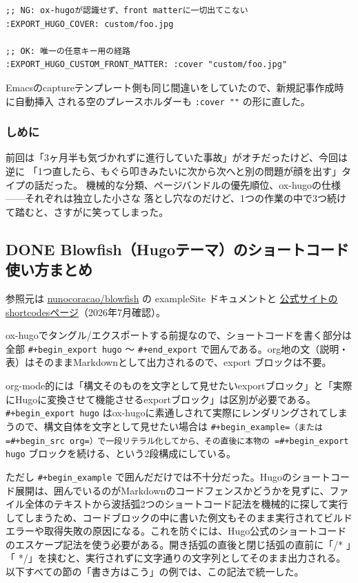 \documentclass[11pt]{article}
\begin{document}
\begin{verbatim}
;; NG: ox-hugoが認識せず、front matterに一切出てこない
:EXPORT_HUGO_COVER: custom/foo.jpg

;; OK: 唯一の任意キー用の経路
:EXPORT_HUGO_CUSTOM_FRONT_MATTER: :cover "custom/foo.jpg"
\end{verbatim}

Emacsのcaptureテンプレート側も同じ間違いをしていたので、新規記事作成時に自動挿入
される空のプレースホルダーも \texttt{:cover ""} の形に直した。
\subsubsection{しめに}
\label{sec:org6e4ee3c}

前回は「3ヶ月半も気づかれずに進行していた事故」がオチだったけど、今回は逆に
「1つ直したら、もぐら叩きみたいに次から次へと別の問題が顔を出す」タイプの話だった。
機械的な分類、ページバンドルの優先順位、ox-hugoの仕様——それぞれは独立した小さな
落とし穴なのだけど、1つの作業の中で3つ続けて踏むと、さすがに笑ってしまった。
\subsection{{\bfseries\sffamily DONE} Blowfish（Hugoテーマ）のショートコード使い方まとめ}
\label{sec:orgb8fda35}
参照元は \href{https://github.com/nunocoracao/blowfish}{nunocoracao/blowfish} の exampleSite ドキュメントと \href{https://blowfish.page/docs/shortcodes/}{公式サイトのshortcodesページ}（2026年7月確認）。

ox-hugoでタングル/エクスポートする前提なので、ショートコードを書く部分は全部 \texttt{\#+begin\_export hugo} 〜 \texttt{\#+end\_export} で囲んである。org地の文（説明・表）はそのままMarkdownとして出力されるので、export ブロックは不要。

org-mode的には「構文そのものを文字として見せたいexportブロック」と「実際にHugoに変換させて機能させるexportブロック」は区別が必要である。 \texttt{\#+begin\_export hugo} はox-hugoに素通しされて実際にレンダリングされてしまうので、構文自体を文字として見せたい場合は \texttt{\#+begin\_example=（または =\#+begin\_src org=）で一段リテラル化してから、その直後に本物の =\#+begin\_export hugo} ブロックを続ける、という2段構成にしている。

ただし \texttt{\#+begin\_example} で囲んだだけでは不十分だった。Hugoのショートコード展開は、囲んでいるのがMarkdownのコードフェンスかどうかを見ずに、ファイル全体のテキストから波括弧2つのショートコード記法を機械的に探して実行してしまうため、コードブロックの中に書いた例文もそのまま実行されてビルドエラーや取得失敗の原因になる。これを防ぐには、Hugo公式のショートコードのエスケープ記法を使う必要がある。開き括弧の直後と閉じ括弧の直前に「/* 」「 */」を挟むと、実行されずに文字通りの文字列としてそのまま出力される。以下すべての節の「書き方はこう」の例では、この記法で統一した。
\end{document}
